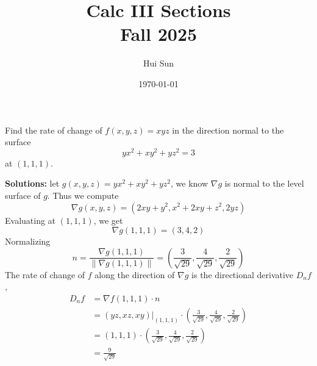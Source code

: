 \documentclass[openany]{book}
\title{Calc III Sections
\\ 
\vspace{0.4cm}
\large Fall 2025}
\date{\today}
\author{Hui Sun}
\begin{document}
\maketitle

\newpage

\begin{prob}
Find the rate of change of \( f(x, y, z) = xyz \) in the direction normal to the surface  
\[ y x^{2} + x y^{2} + y z^{2} = 3 \] at \((1, 1, 1)\).
\end{prob}
\textbf{Solutions:} let $g(x,y,z)=yx^2+xy^2+yz^2$, we know $\nabla g$ is normal to the level surface of $g$. Thus we compute 
\begin{equation*}
    \nabla g(x,y,z)=(
        2xy+y^2,x^2+2xy+z^2,2yz)
\end{equation*}
Evaluating at $(1,1,1)$, we get 
\begin{equation*}
    \nabla g(1,1,1)=(3,4,2)
\end{equation*}
Normalizing
\begin{equation*}
    n=\frac{\nabla g(1,1,1)}{\|\nabla g(1,1,1)\|}=\left(\frac{3}{\sqrt{29}},\frac{4}{\sqrt{29}},\frac{2}{\sqrt{29}}\right)
\end{equation*}
The rate of change of $f$ along the direction of $\nabla g$ is the directional derivative $D_{n}f$, 
\begin{align*}
    D_{n}f&=\nabla f(1,1,1)\cdot n\\
    &=(yz, xz, xy)\bigg\vert_{(1,1,1)}\cdot\left(\frac{3}{\sqrt{29}},\frac{4}{\sqrt{29}},\frac{2}{\sqrt{29}}\right)\\
    &=(1,1,1)\cdot\left(\frac{3}{\sqrt{29}},\frac{4}{\sqrt{29}},\frac{2}{\sqrt{29}}\right)\\
    &=\frac{9}{\sqrt{29}}
\end{align*}
\end{document}
